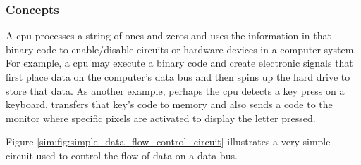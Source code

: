 \subsubsection{Concepts}

A \gls{cpu} processes a string of ones and zeros and uses the information in that binary code to enable/disable circuits or hardware devices in a computer system. For example, a \gls{cpu} may execute a binary code and create electronic signals that first place data on the computer's data bus and then spins up the hard drive to store that data. As another example, perhaps the \gls{cpu} detects a key press on a keyboard, transfers that key's code to memory and also sends a code to the monitor where specific pixels are activated to display the letter pressed.

Figure \ref{sim:fig:simple_data_flow_control_circuit} illustrates a very simple circuit used to control the flow of data on a data bus.

